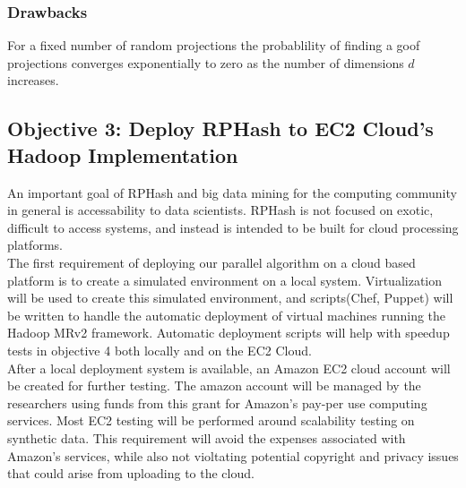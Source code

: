 \documentclass[a4paper,10pt]{article}
\begin{document}
\subsubsection{Drawbacks}
For a fixed number of random projections the probablility of finding a goof projections
converges exponentially to zero as the number of dimensions $d$ increases.\cite{florescu09}

\subsection{Objective 3: Deploy RPHash to EC2 Cloud's Hadoop Implementation}
An important goal of RPHash and big data mining for the computing community in general
is accessability to data scientists. RPHash is not focused on exotic, difficult to
access systems, and instead is intended to be built for cloud processing platforms.\\

The first requirement of deploying our parallel algorithm on a cloud based platform is
to create a simulated environment on a local system. Virtualization will be used to
create this simulated environment, and scripts(Chef, Puppet) will be written to handle the automatic
deployment of virtual machines running the Hadoop MRv2 framework. Automatic deployment
scripts will help with speedup tests in objective 4 both locally and on the EC2 Cloud.\\

After a local deployment system is available, an Amazon EC2 cloud account will be created for
further testing. The amazon account will be managed by the researchers using funds from
this grant for Amazon's pay-per use computing services. Most EC2 testing will be 
performed around scalability testing on synthetic data. This requirement will avoid
the expenses associated with Amazon's services, while also not violtating potential
copyright and privacy issues that could arise from uploading to the cloud.
\end{document}
